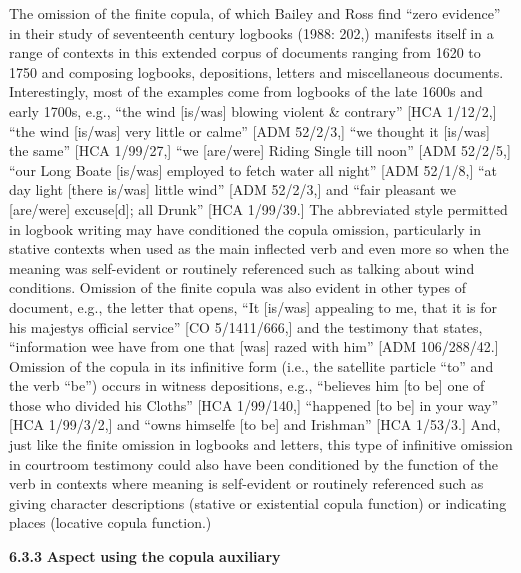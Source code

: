 The omission of the finite copula, of which Bailey and Ross find “zero evidence” in their study of seventeenth century logbooks (1988: 202,) manifests itself in a range of contexts in this extended corpus of documents ranging from 1620 to 1750 and composing logbooks, depositions, letters and miscellaneous documents. Interestingly, most of the examples come from logbooks of the late 1600s and early 1700s, e.g., “the wind [is/was] blowing violent \& contrary” [HCA 1/12/2,] “the wind [is/was] very little or calme” [ADM 52/2/3,] “we thought it [is/was] the same” [HCA 1/99/27,] “we [are/were] Riding Single till noon” [ADM 52/2/5,] “our Long Boate [is/was] employed to fetch water all night” [ADM 52/1/8,] “at day light [there is/was] little wind” [ADM 52/2/3,] and “fair pleasant we [are/were] excuse[d]; all Drunk” [HCA 1/99/39.] The abbreviated style permitted in logbook writing may have conditioned the copula omission, particularly in stative contexts when used as the main inflected verb and even more so when the meaning was self-evident or routinely referenced such as talking about wind conditions.  Omission of the finite copula was also evident in other types of document, e.g., the letter that opens, “It [is/was] appealing to me, that it is for his majestys official service” [CO 5/1411/666,] and the testimony that states, “information wee have from one that [was] razed with him” [ADM 106/288/42.] Omission of the copula in its infinitive form (i.e., the satellite particle “to” and the verb “be”) occurs in witness depositions, e.g., “believes him [to be] one of those who divided his Cloths” [HCA 1/99/140,] “happened [to be] in your way” [HCA 1/99/3/2,] and “owns himselfe [to be] and Irishman” [HCA 1/53/3.] And, just like the finite omission in logbooks and letters, this type of infinitive omission in courtroom testimony could also have been conditioned by the function of the verb in contexts where meaning is self-evident or routinely referenced such as giving character descriptions (stative or existential copula function) or indicating places (locative copula function.)

\textbf{6.3.3} \textbf{Aspect} \textbf{using} \textbf{the} \textbf{copula} \textbf{auxiliary}

